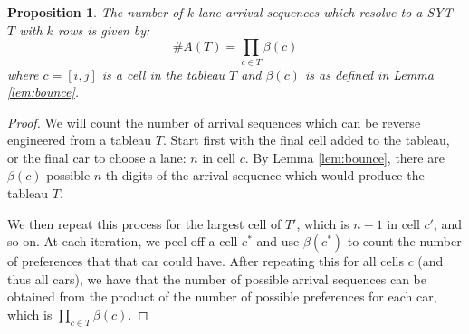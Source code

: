 \documentclass[article]{amsart}
\theoremstyle{plain}
\newtheorem{proposition}{Proposition}
\theoremstyle{definition}
\begin{document}
\begin{proposition} \label{prop:syt_enumer}
    The number of $k$-lane arrival sequences which resolve to a SYT $T$ with $k$ rows is given by:
    $$\#A(T) = \prod_{c \in T} \beta(c)$$
    where $c = [i,j]$ is a cell in the tableau $T$ and $\beta(c)$ is as defined in Lemma \ref{lem:bounce}.
\end{proposition}


\begin{proof}
    We will count the number of arrival sequences which can be reverse engineered from a tableau $T$. Start first with the final cell added to the tableau, or the final car to choose a lane: $n$ in cell $c$. By Lemma \ref{lem:bounce}, there are $\beta(c)$ possible $n$-th digits of the arrival sequence which would produce the tableau $T$. 

    We then repeat this process for the largest cell of $T'$, which is $n-1$ in cell $c'$, and so on. At each iteration, we peel off a cell $c^\ast$ and use $\beta(c^\ast)$ to count the number of preferences that that car could have. After repeating this for all cells $c$ (and thus all cars), we have that the number of possible arrival sequences can be obtained from the product of the number of possible preferences for each car, which is $\prod_{c \in T} \beta (c)$. 
\end{proof}
\end{document}
